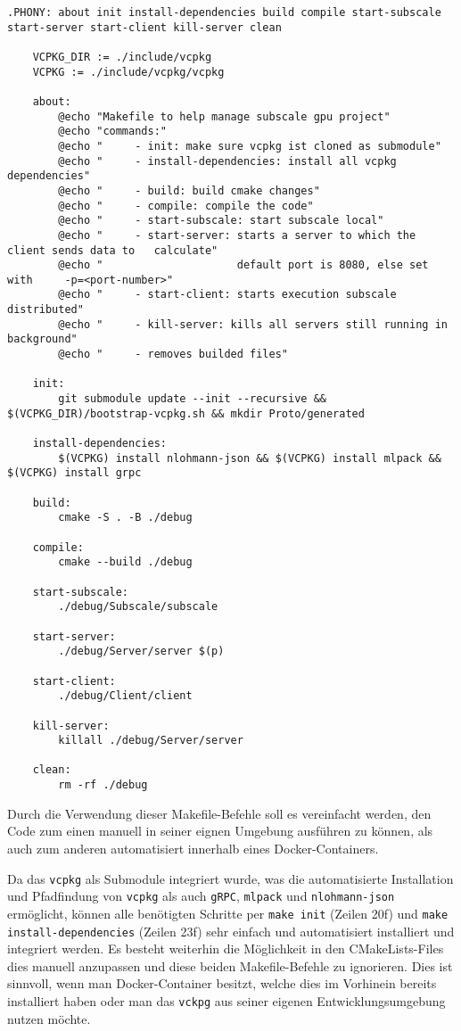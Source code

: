 \begin{lstlisting}[caption=Makefile, label={code:Makefile}, captionpos=b]
    .PHONY: about init install-dependencies build compile start-subscale start-server start-client kill-server clean

    VCPKG_DIR := ./include/vcpkg
    VCPKG := ./include/vcpkg/vcpkg
    
    about:
	    @echo "Makefile to help manage subscale gpu project"
	    @echo "commands:"
	    @echo "     - init: make sure vcpkg ist cloned as submodule"
	    @echo "     - install-dependencies: install all vcpkg dependencies"
	    @echo "     - build: build cmake changes"
	    @echo "     - compile: compile the code"
	    @echo "     - start-subscale: start subscale local"
	    @echo "     - start-server: starts a server to which the client sends data to   calculate"
	    @echo "                     default port is 8080, else set with     -p=<port-number>"
	    @echo "     - start-client: starts execution subscale distributed"
	    @echo "     - kill-server: kills all servers still running in background"
	    @echo "     - removes builded files"
    
    init:
        git submodule update --init --recursive && $(VCPKG_DIR)/bootstrap-vcpkg.sh && mkdir Proto/generated
    
    install-dependencies:
        $(VCPKG) install nlohmann-json && $(VCPKG) install mlpack && $(VCPKG) install grpc
    
    build:
        cmake -S . -B ./debug
    
    compile:
        cmake --build ./debug
    
    start-subscale:
        ./debug/Subscale/subscale
    
    start-server:
        ./debug/Server/server $(p)
    
    start-client:
        ./debug/Client/client
    
    kill-server:
        killall ./debug/Server/server
    
    clean:
        rm -rf ./debug
\end{lstlisting}

Durch die Verwendung dieser Makefile-Befehle soll es vereinfacht werden, den Code zum einen manuell in seiner eignen Umgebung ausführen zu können, als auch zum anderen automatisiert innerhalb eines Docker-Containers.

Da das \verb|vcpkg| als Submodule integriert wurde, was die automatisierte Installation und Pfadfindung von \verb|vcpkg| als auch \verb|gRPC|, \verb|mlpack| und \verb|nlohmann-json| ermöglicht, können alle benötigten Schritte per \verb|make init| (Zeilen 20f) und \verb|make install-dependencies| (Zeilen 23f) sehr einfach und automatisiert installiert und integriert werden. Es besteht weiterhin die Möglichkeit in den CMakeLists-Files dies manuell anzupassen und diese beiden Makefile-Befehle zu ignorieren. Dies ist sinnvoll, wenn man Docker-Container besitzt, welche dies im Vorhinein bereits installiert haben oder man das \verb|vckpg| aus seiner eigenen Entwicklungsumgebung nutzen möchte.

